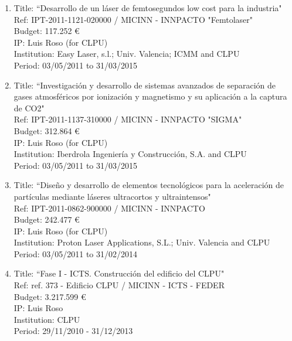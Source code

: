 \begin{enumerate}
\item Title: ``Desarrollo de un l\'aser de femtosegundos low cost para la industria"\\
Ref:  IPT-2011-1121-020000     / MICINN - INNPACTO "Femtolaser" \\
Budget: 117.252 \euro \\
IP:  Luis Roso (for CLPU) \\
Institution:  Easy Laser, s.l.; Univ. Valencia; ICMM and CLPU \\
Period:  03/05/2011 to 31/03/2015 \\

\item Title: ``Investigaci\'on y desarrollo de sistemas avanzados de separaci\'on de gases atmosf\'ericos por ionizaci\'on y magnetismo y su aplicaci\'on a la captura de CO2"\\
Ref:   IPT-2011-1137-310000     / MICINN - INNPACTO "SIGMA" \\
Budget:  312.864 \euro \\
IP:  Luis Roso (for CLPU) \\
Institution:  Iberdrola Ingenier\'ia y Construcci\'on, S.A. and CLPU \\
Period: 03/05/2011 to 31/03/2015 \\

\item Title: ``Dise\~no y desarrollo de elementos tecnol\'ogicos para la aceleraci\'on de part\'iculas mediante l\'aseres ultracortos y ultraintensos"\\
Ref:  IPT-2011-0862-900000     / MICINN - INNPACTO \\
Budget: 242.477 \euro \\
IP:  Luis Roso (for CLPU) \\
Institution:  Proton Laser Applications, S.L.; Univ. Valencia and CLPU \\
Period:   03/05/2011 to 31/02/2014 \\

\item Title: ``Fase I - ICTS. Construcci\'on del edificio del CLPU"\\
Ref:   ref. 373 - Edificio CLPU     / MICINN - ICTS - FEDER \\
Budget:  3.217.599 \euro \\
IP:  Luis Roso \\
Institution:  CLPU \\
Period:  29/11/2010 - 31/12/2013 \\


\end{enumerate}
